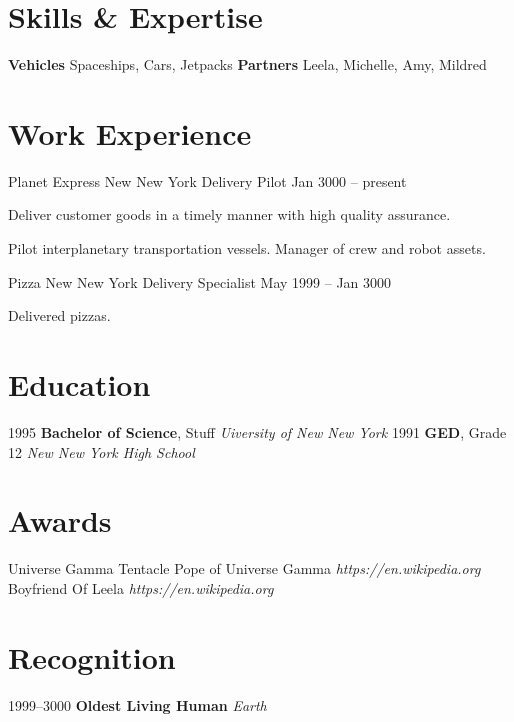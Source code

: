 \documentclass{article}
\begin{document}
  \section*{Skills \& Expertise}
    \ResumeLayout
      {\textbf{Vehicles}}
      {Spaceships, Cars, Jetpacks}
    \ResumeLayout
      {\textbf{Partners}}
      {Leela, Michelle, Amy, Mildred }
  \medskip
  \section*{Work Experience}
    \WorkExperience
      {Planet Express}
      {New New York}
      {Delivery Pilot}
      {Jan 3000 -- present}
      {
          \item Deliver customer goods in a timely manner with high quality assurance.

          \item Pilot interplanetary transportation vessels. Manager of crew and robot assets.
      }
    \WorkExperience
      {Pizza}
      {New New York}
      {Delivery Specialist}
      {May 1999 -- Jan 3000}
      {
          \item Delivered pizzas.
      }
  \medskip
  \section*{Education}
    \ResumeLayout
      {1995}
      {\textbf{Bachelor of Science}, Stuff \hfill \textit{Uiversity of New New York}}
    \ResumeLayout
      {1991}
      {\textbf{GED}, Grade 12 \hfill \textit{New New York High School}}
  \medskip
  \section*{Awards}
    \ResumeLayout
      {Universe Gamma}
      {Tentacle Pope of Universe Gamma \hfill \textit{https://en.wikipedia.org}}
    \ResumeLayout
      {Boyfriend}
      {Of Leela \hfill \textit{https://en.wikipedia.org}}
  \medskip
  \section*{Recognition}
    \ResumeLayout
      {1999--3000}
      {\textbf{Oldest Living Human} \hfill \textit{Earth}}
\end{document}
